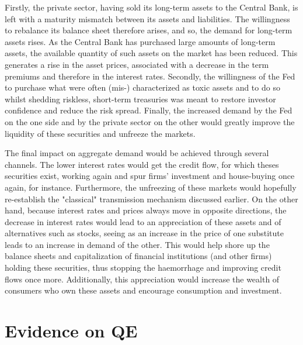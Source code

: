 \documentclass[11pt,a4paper,oneside]{book}
\begin{document}
Firstly, the private sector, having sold its long-term assets to the Central Bank, is left with a maturity mismatch between its assets and liabilities. The willingness to rebalance its balance sheet therefore arises, and so, the demand for long-term assets rises. As the Central Bank has purchased large amounts of long-term assets, the available quantity of such assets on the market has been reduced. This generates a rise in the asset prices, associated with a decrease in the term premiums and therefore in the interest rates. Secondly, the willingness of the Fed to purchase what were often (mis-) characterized as toxic assets and to do so whilst shedding riskless, short-term treasuries was meant to restore investor confidence and reduce the risk spread. Finally, the increased demand by the Fed on the one side and by the private sector on the other would greatly improve the liquidity of these securities and unfreeze the markets.

The final impact on aggregate demand would be achieved through several channels. The lower interest rates would get the credit flow, for which theses securities exist, working again and spur firms' investment and house-buying once again, for instance. Furthermore, the unfreezing of these markets would hopefully re-establish the "classical" transmission mechanism discussed earlier. On the other hand, because interest rates and prices always move in opposite directions, the decrease in interest rates would lead to an appreciation of these assets and of alternatives such as stocks, seeing as an increase in the price of one substitute leads to an increase in demand of the other. This would help shore up the balance sheets and capitalization of financial institutions (and other firms) holding these securities, thus stopping the haemorrhage and improving credit flows once more. Additionally, this appreciation would increase the wealth of consumers who own these assets and encourage consumption and investment.

\section{Evidence on QE}
\label{sec:Evidence_QE}
\end{document}
